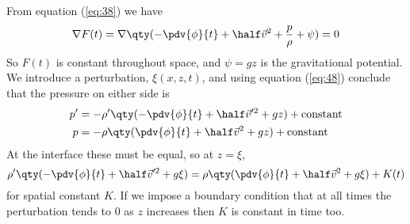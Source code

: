 From equation (\ref{eq:38}) we have
\begin{equation}
  \label{eq:48}
  \nabla F(t) = \nabla \qty( -\pdv{\phi}{t} + \half \vec{v}^2 + \frac{p}{\rho} + \psi) = 0
\end{equation}
So $F(t)$ is constant throughout space, and $\psi = gz$ is the
gravitational potential. We introduce a perturbation, $\xi(x,z,t)$,
and using equation (\ref{eq:48}) conclude that the pressure on either
side is
\begin{subequations}
  \begin{align}
    p' &= - \rho' \qty( - \pdv{\phi}{t} + \half \vec{v}'^2 + gz ) + \text{constant} \\
p &= - \rho \qty(\pdv{\phi}{t} + \half \vec{v}^2 + gz ) + \text{constant}
  \end{align}
\end{subequations}
At the interface these must be equal, so at $z=\xi$,
\begin{equation}
  \label{eq:49}
   \rho' \qty( - \pdv{\phi}{t} + \half \vec{v}'^2 + g \xi ) = \rho \qty(\pdv{\phi}{t} + \half \vec{v}^2 + g\xi ) + K(t)
\end{equation}
for spatial constant $K$. If we impose a boundary condition that at
all times the perturbation tends to $0$ as $z$ increases then $K$ is
constant in time too.

